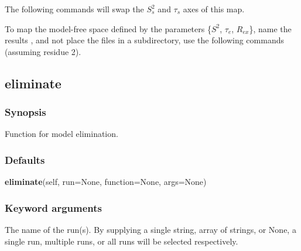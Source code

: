 




The following commands will swap the $S^2_s$ and $\tau_s$ axes of this map. 





To map  the model-free space 
 defined by the parameters \{$S^2$, $\tau_e$, $R_{ex}$\}, name the results
, and not place the files in a subdirectory, use the following commands (assuming
residue 2).





\newpage

\subsection{eliminate}


\subsubsection{Synopsis}

Function for model elimination.

\subsubsection{Defaults}

\textsf{\textbf{eliminate}(self, run=None, function=None, args=None)}


\subsubsection{Keyword arguments}


  The name of the run(s).  By supplying a single string, array of strings, or None, a single run, multiple runs, or all runs will be selected respectively.

